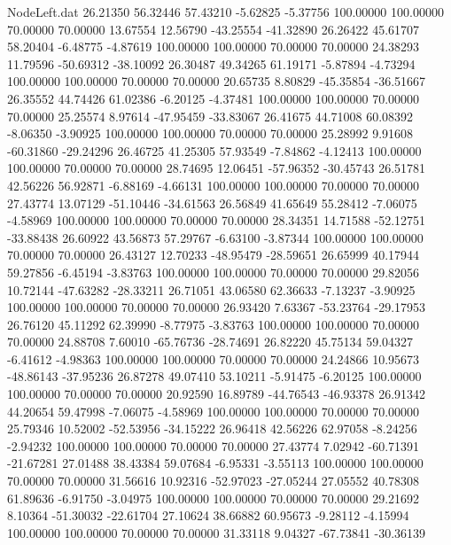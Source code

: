 \begin{filecontents}{NodeLeft.dat}
  26.21350   56.32446   57.43210    -5.62825   -5.37756  100.00000  100.00000   70.00000   70.00000   13.67554   12.56790  -43.25554  -41.32890
  26.26422   45.61707   58.20404    -6.48775   -4.87619  100.00000  100.00000   70.00000   70.00000   24.38293   11.79596  -50.69312  -38.10092
  26.30487   49.34265   61.19171    -5.87894   -4.73294  100.00000  100.00000   70.00000   70.00000   20.65735    8.80829  -45.35854  -36.51667
  26.35552   44.74426   61.02386    -6.20125   -4.37481  100.00000  100.00000   70.00000   70.00000   25.25574    8.97614  -47.95459  -33.83067
  26.41675   44.71008   60.08392    -8.06350   -3.90925  100.00000  100.00000   70.00000   70.00000   25.28992    9.91608  -60.31860  -29.24296
  26.46725   41.25305   57.93549    -7.84862   -4.12413  100.00000  100.00000   70.00000   70.00000   28.74695   12.06451  -57.96352  -30.45743
  26.51781   42.56226   56.92871    -6.88169   -4.66131  100.00000  100.00000   70.00000   70.00000   27.43774   13.07129  -51.10446  -34.61563
  26.56849   41.65649   55.28412    -7.06075   -4.58969  100.00000  100.00000   70.00000   70.00000   28.34351   14.71588  -52.12751  -33.88438
  26.60922   43.56873   57.29767    -6.63100   -3.87344  100.00000  100.00000   70.00000   70.00000   26.43127   12.70233  -48.95479  -28.59651
  26.65999   40.17944   59.27856    -6.45194   -3.83763  100.00000  100.00000   70.00000   70.00000   29.82056   10.72144  -47.63282  -28.33211
  26.71051   43.06580   62.36633    -7.13237   -3.90925  100.00000  100.00000   70.00000   70.00000   26.93420    7.63367  -53.23764  -29.17953
  26.76120   45.11292   62.39990    -8.77975   -3.83763  100.00000  100.00000   70.00000   70.00000   24.88708    7.60010  -65.76736  -28.74691
  26.82220   45.75134   59.04327    -6.41612   -4.98363  100.00000  100.00000   70.00000   70.00000   24.24866   10.95673  -48.86143  -37.95236
  26.87278   49.07410   53.10211    -5.91475   -6.20125  100.00000  100.00000   70.00000   70.00000   20.92590   16.89789  -44.76543  -46.93378
  26.91342   44.20654   59.47998    -7.06075   -4.58969  100.00000  100.00000   70.00000   70.00000   25.79346   10.52002  -52.53956  -34.15222
  26.96418   42.56226   62.97058    -8.24256   -2.94232  100.00000  100.00000   70.00000   70.00000   27.43774    7.02942  -60.71391  -21.67281
  27.01488   38.43384   59.07684    -6.95331   -3.55113  100.00000  100.00000   70.00000   70.00000   31.56616   10.92316  -52.97023  -27.05244
  27.05552   40.78308   61.89636    -6.91750   -3.04975  100.00000  100.00000   70.00000   70.00000   29.21692    8.10364  -51.30032  -22.61704
  27.10624   38.66882   60.95673    -9.28112   -4.15994  100.00000  100.00000   70.00000   70.00000   31.33118    9.04327  -67.73841  -30.36139

\end{filecontents}
